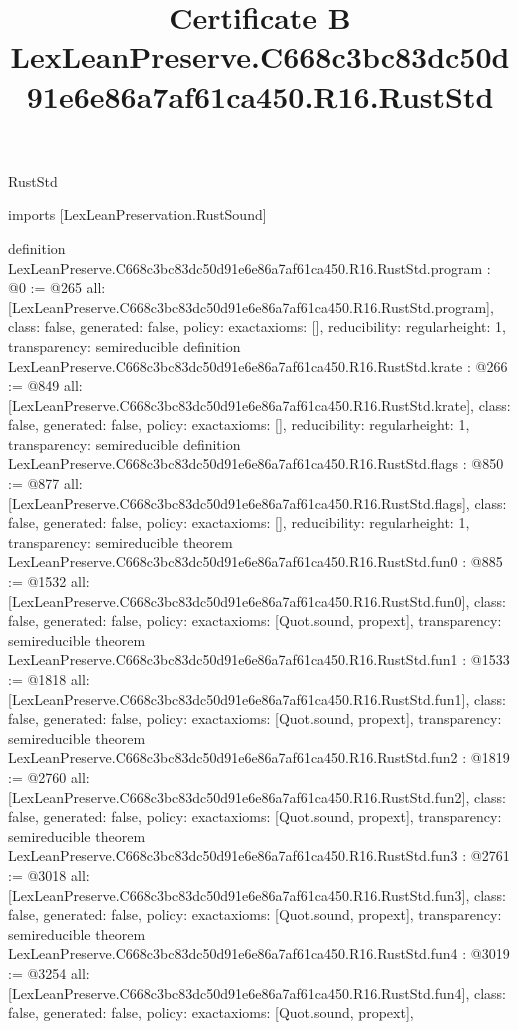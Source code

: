 \begin{lexlean}{RustStd}
\title{Certificate B LexLeanPreserve.C668c3bc83dc50d91e6e86a7af61ca450.R16.RustStd}
\begin{coremodule}
imports [LexLeanPreservation.RustSound]

definition LexLeanPreserve.C668c3bc83dc50d91e6e86a7af61ca450.R16.RustStd.program : @0 := @265 {
  all: [LexLeanPreserve.C668c3bc83dc50d91e6e86a7af61ca450.R16.RustStd.program],
  class: false,
  generated: false,
  policy: exact{axioms: []},
  reducibility: regular{height: 1},
  transparency: semireducible
}
definition LexLeanPreserve.C668c3bc83dc50d91e6e86a7af61ca450.R16.RustStd.krate : @266 := @849 {
  all: [LexLeanPreserve.C668c3bc83dc50d91e6e86a7af61ca450.R16.RustStd.krate],
  class: false,
  generated: false,
  policy: exact{axioms: []},
  reducibility: regular{height: 1},
  transparency: semireducible
}
definition LexLeanPreserve.C668c3bc83dc50d91e6e86a7af61ca450.R16.RustStd.flags : @850 := @877 {
  all: [LexLeanPreserve.C668c3bc83dc50d91e6e86a7af61ca450.R16.RustStd.flags],
  class: false,
  generated: false,
  policy: exact{axioms: []},
  reducibility: regular{height: 1},
  transparency: semireducible
}
theorem LexLeanPreserve.C668c3bc83dc50d91e6e86a7af61ca450.R16.RustStd.fun0 : @885 := @1532 {
  all: [LexLeanPreserve.C668c3bc83dc50d91e6e86a7af61ca450.R16.RustStd.fun0],
  class: false,
  generated: false,
  policy: exact{axioms: [Quot.sound, propext]},
  transparency: semireducible
}
theorem LexLeanPreserve.C668c3bc83dc50d91e6e86a7af61ca450.R16.RustStd.fun1 : @1533 := @1818 {
  all: [LexLeanPreserve.C668c3bc83dc50d91e6e86a7af61ca450.R16.RustStd.fun1],
  class: false,
  generated: false,
  policy: exact{axioms: [Quot.sound, propext]},
  transparency: semireducible
}
theorem LexLeanPreserve.C668c3bc83dc50d91e6e86a7af61ca450.R16.RustStd.fun2 : @1819 := @2760 {
  all: [LexLeanPreserve.C668c3bc83dc50d91e6e86a7af61ca450.R16.RustStd.fun2],
  class: false,
  generated: false,
  policy: exact{axioms: [Quot.sound, propext]},
  transparency: semireducible
}
theorem LexLeanPreserve.C668c3bc83dc50d91e6e86a7af61ca450.R16.RustStd.fun3 : @2761 := @3018 {
  all: [LexLeanPreserve.C668c3bc83dc50d91e6e86a7af61ca450.R16.RustStd.fun3],
  class: false,
  generated: false,
  policy: exact{axioms: [Quot.sound, propext]},
  transparency: semireducible
}
theorem LexLeanPreserve.C668c3bc83dc50d91e6e86a7af61ca450.R16.RustStd.fun4 : @3019 := @3254 {
  all: [LexLeanPreserve.C668c3bc83dc50d91e6e86a7af61ca450.R16.RustStd.fun4],
  class: false,
  generated: false,
  policy: exact{axioms: [Quot.sound, propext]},
}
\end{coremodule}
\end{lexlean}
